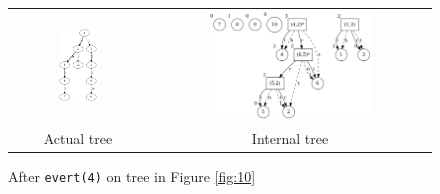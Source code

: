 \documentclass[a4paper, 11pt]{article}
\begin{document}
\begin{figure}[H]
\centering
\begin{tabular}{cc}
  \includegraphics[width=0.3\textwidth]{img/visualisations/test2/evert.png} & \includegraphics[width=0.6\textwidth]{img/visualisations/test2/ievert.png} \\
  Actual tree & Internal tree \\
\end{tabular}
\caption{After \texttt{evert(4)} on tree in Figure \ref{fig:10}}
\label{fig:11}
\end{figure}
\end{document}
